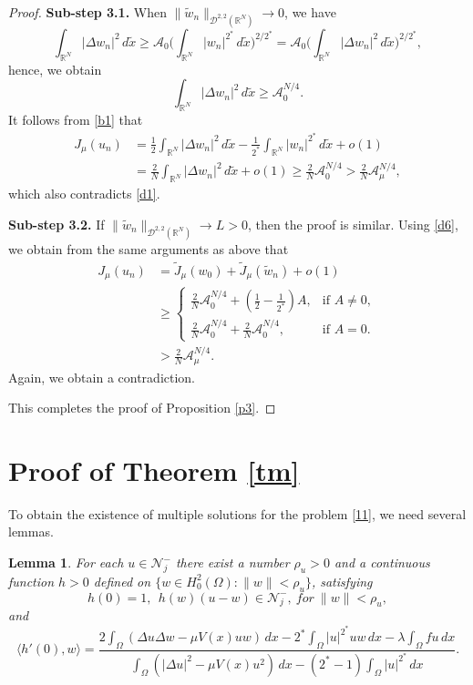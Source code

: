 \documentclass[10pt,a4paper]{amsart}
\numberwithin{equation}{section}
\newtheorem{lemma}[theorem]{Lemma}
\begin{document}
\begin{proof}
\noindent\textbf{Sub-step 3.1.} 
When \(\|\tilde{w}_n\|_{ \mathcal{D}^{2,2}(\mathbb{R}^N)}\to 0\), we have
\[
 \int_{\mathbb{R}^N}|\Delta {w}_n|^2\,d\tilde{x}
 \geq \mathcal{A}_{0}\Big( \int _{\mathbb{R}^N}|{w}_n|^{2^*}\,d\tilde{x}\Big) ^{2/2^*}
 =\mathcal{A}_{0}\Big( \int_{\mathbb{R}^N}|\Delta {w}_n|^2\,d\tilde{x}\Big) ^{2/2^*},
\]
hence, we obtain
\[
 \int_{\mathbb{R}^N}|\Delta {w}_n|^2\,d\tilde{x}\geq \mathcal{A}_{0}^{N/4}.
\]
It follows from \eqref{b1} that
\begin{align*}
 J_\mu(u_n)
 &=\frac{1}{2}\int_{\mathbb{R}^N}|\Delta {w}_n|^2\,d\tilde{x}-\frac{1}{2^*}
 \int _{\mathbb{R}^N}|{w}_n|^{2^*}\,d\tilde{x}+o(1)\\
 &=\frac{2}{N}\int_{\mathbb{R}^N}|\Delta {w}_n|^2\,d\tilde{x}+o(1)\geq \frac{2}{N}\mathcal{A}_{0}^{N/4}> \frac{2}{N}\mathcal{A}_{\mu}^{N/4},
\end{align*}
which also contradicts \eqref{d1}.
\smallskip

\noindent\textbf{Sub-step 3.2.} 
If \(\|\tilde{w}_n\|_{ \mathcal{D}^{2,2}(\mathbb{R}^N)}\to L>0\), then the proof 
is similar. Using \eqref{d6}, we obtain from the same arguments as above that
 \begin{align*}
 J_\mu(u_n)
 &=\tilde{J}_\mu(w_0)+\tilde{J}_\mu( \tilde{w}_n)+o(1) \\
 &\geq  \begin{cases}
 \frac{2}{N}\mathcal{A}_{0}^{N/4}+ \left( \frac{1}{2}-\frac{1}{2^*}\right) A, 
  &\text{if } A\neq 0, \\
 \frac{2}{N}\mathcal{A}_{0}^{N/4}+\frac{2}{N}\mathcal{A}_{0}^{N/4},  
 &\text{if } A=0.
 \end{cases}
 \\
 &>\frac{2}{N}\mathcal{A}_{\mu}^{N/4}.
 \end{align*}
 Again, we obtain a contradiction.
 
 This completes the proof of Proposition \ref{p3}.
 \end{proof}
 
 \section{Proof of Theorem \ref{tm}}
 To obtain the existence of multiple solutions for the problem \eqref{11},
we need several lemmas.

 \begin{lemma}
For each \(u\in \mathcal{N}^-_j\) there exist a number \(\rho_u>0\) and a 
continuous function \(h>0\) defined on \(\{w \in H^2_0(\Omega): \|w\|<\rho_u \}\), 
satisfying 
\[
 h(0)=1, \ \ h(w)(u-w)\in \mathcal{N}^-_j , \ for \ \|w\|<\rho_u,
\]
and
\[
 \langle h'(0),w\rangle=\frac{2\int_{\Omega} \left( \Delta u\Delta w-\mu V(x)uw\right)\,dx -2^*\int_{\Omega} |u|^{2^*}uw\,dx-\lambda \int_{\Omega} fu\,dx}{\int_{\Omega} \left( |\Delta u|^2-\mu V(x)u^2\right)\,dx -(2^*-1)\int_{\Omega} |u|^{2^*}\,dx}.
\]
\end{lemma}
\end{document}
